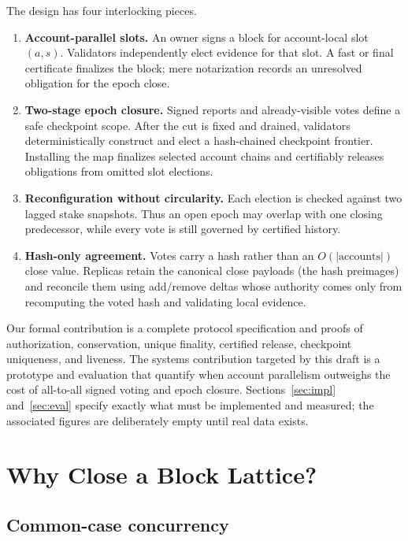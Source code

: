 \documentclass[sigplan,review,anonymous]{acmart}
\begin{document}
The design has four interlocking pieces.

\begin{enumerate}[leftmargin=1.3em,itemsep=1pt,topsep=2pt]
\item \textbf{Account-parallel slots.}  An owner signs a block for account-local slot $(a,s)$.  Validators independently elect evidence for that slot.  A fast or final certificate finalizes the block; mere notarization records an unresolved obligation for the epoch close.
\item \textbf{Two-stage epoch closure.}  Signed reports and already-visible votes define a safe checkpoint scope.  After the cut is fixed and drained, validators deterministically construct and elect a hash-chained checkpoint frontier.  Installing the map finalizes selected account chains and certifiably releases obligations from omitted slot elections.
\item \textbf{Reconfiguration without circularity.}  Each election is checked against two lagged stake snapshots.  Thus an open epoch may overlap with one closing predecessor, while every vote is still governed by certified history.
\item \textbf{Hash-only agreement.}  Votes carry a hash rather than an $O(|\text{accounts}|)$ close value.  Replicas retain the canonical close payloads (the hash preimages) and reconcile them using add/remove deltas whose authority comes only from recomputing the voted hash and validating local evidence.
\end{enumerate}

Our formal contribution is a complete protocol specification and proofs of authorization, conservation, unique finality, certified release, checkpoint uniqueness, and liveness.  The systems contribution targeted by this draft is a prototype and evaluation that quantify when account parallelism outweighs the cost of all-to-all signed voting and epoch closure.  Sections~\ref{sec:impl} and~\ref{sec:eval} specify exactly what must be implemented and measured; the associated figures are deliberately empty until real data exists.

\section{Why Close a Block Lattice?}
\label{sec:motivation}

\subsection{Common-case concurrency}
\end{document}
